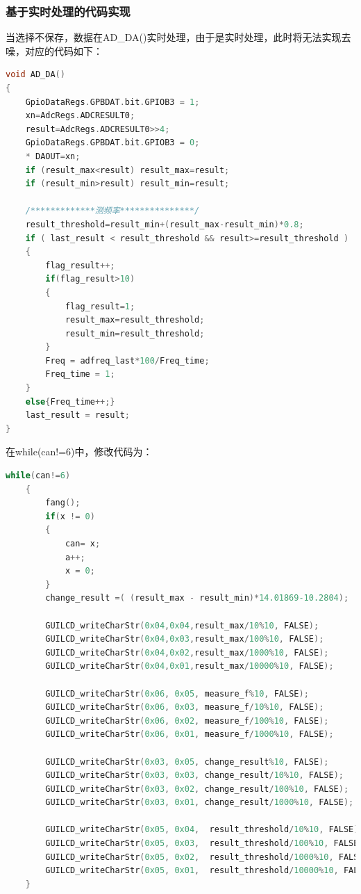 \documentclass[12pt]{article}
\begin{document}
\subsubsection{基于实时处理的代码实现}
当选择不保存，数据在AD\_DA()实时处理，由于是实时处理，此时将无法实现去噪，对应的代码如下：
\begin{lstlisting}[language=C]
void AD_DA()
{
	GpioDataRegs.GPBDAT.bit.GPIOB3 = 1;
	xn=AdcRegs.ADCRESULT0;
	result=AdcRegs.ADCRESULT0>>4;
	GpioDataRegs.GPBDAT.bit.GPIOB3 = 0;
	* DAOUT=xn;
	if (result_max<result) result_max=result;
	if (result_min>result) result_min=result;

	/*************测频率***************/
	result_threshold=result_min+(result_max-result_min)*0.8;
	if ( last_result < result_threshold && result>=result_threshold )
	{
		flag_result++;
		if(flag_result>10)
		{
			flag_result=1;
			result_max=result_threshold;
			result_min=result_threshold;
		}
		Freq = adfreq_last*100/Freq_time;
		Freq_time = 1;
	}
	else{Freq_time++;}
	last_result = result;
}
\end{lstlisting}
在while(can!=6)中，修改代码为：

\begin{lstlisting}[language=C]
while(can!=6)
    {
     	fang();
	    if(x != 0)
		{
			can= x;
			a++;
			x = 0;		
	    }
		change_result =( (result_max - result_min)*14.01869-10.2804);
		
		GUILCD_writeCharStr(0x04,0x04,result_max/10%10, FALSE);
		GUILCD_writeCharStr(0x04,0x03,result_max/100%10, FALSE);
		GUILCD_writeCharStr(0x04,0x02,result_max/1000%10, FALSE);
		GUILCD_writeCharStr(0x04,0x01,result_max/10000%10, FALSE);

		GUILCD_writeCharStr(0x06, 0x05, measure_f%10, FALSE);
		GUILCD_writeCharStr(0x06, 0x03, measure_f/10%10, FALSE);
		GUILCD_writeCharStr(0x06, 0x02, measure_f/100%10, FALSE);
		GUILCD_writeCharStr(0x06, 0x01, measure_f/1000%10, FALSE);

		GUILCD_writeCharStr(0x03, 0x05, change_result%10, FALSE);
		GUILCD_writeCharStr(0x03, 0x03, change_result/10%10, FALSE);
		GUILCD_writeCharStr(0x03, 0x02, change_result/100%10, FALSE);
		GUILCD_writeCharStr(0x03, 0x01, change_result/1000%10, FALSE);

		GUILCD_writeCharStr(0x05, 0x04,  result_threshold/10%10, FALSE);
		GUILCD_writeCharStr(0x05, 0x03,  result_threshold/100%10, FALSE);
		GUILCD_writeCharStr(0x05, 0x02,  result_threshold/1000%10, FALSE);
		GUILCD_writeCharStr(0x05, 0x01,  result_threshold/10000%10, FALSE);
	}
\end{lstlisting}
\end{document}
